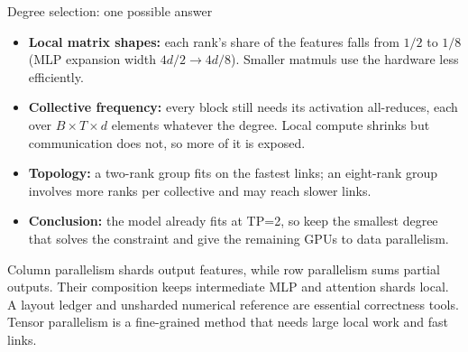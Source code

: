 \documentclass[handout]{beamer}
\begin{document}
\begin{frame}{Degree selection: one possible answer}
  \small
  \begin{itemize}
      \setlength{\itemsep}{8pt}
    \item \textbf{Local matrix shapes:} each rank's share of the features falls from $1/2$ to $1/8$ (MLP expansion width $4d/2\to4d/8$). Smaller matmuls use the hardware less efficiently.
    \item \textbf{Collective frequency:} every block still needs its activation all-reduces, each over $B\times T\times d$ elements whatever the degree. Local compute shrinks but communication does not, so more of it is exposed.
    \item \textbf{Topology:} a two-rank group fits on the fastest links; an eight-rank group involves more ranks per collective and may reach slower links.
    \item \textbf{Conclusion:} the model already fits at TP=2, so keep the smallest degree that solves the constraint and give the remaining GPUs to data parallelism.
  \end{itemize}
\end{frame}

\takeaways
{Column parallelism shards output features, while row parallelism sums partial outputs.}
{Their composition keeps intermediate MLP and attention shards local.}
{A layout ledger and unsharded numerical reference are essential correctness tools.}
{Tensor parallelism is a fine-grained method that needs large local work and fast links.}
\end{document}
